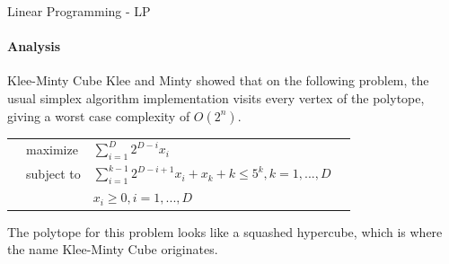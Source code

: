 \documentclass{beamer}
\begin{document}
%	
	\begin{frame}{Linear Programming - LP}
		\framesubtitle{Analysis}
		\begin{block}{Klee-Minty Cube}
			Klee and Minty showed that on the following problem, the usual simplex algorithm implementation visits every vertex of the polytope, giving a worst case complexity of $O(2^n)$.
			\begin{tabularx}{\textwidth}{X l l X}
				& maximize		& $\sum_{i=1}^{D}2^{D-i}x_i$		& \\
				& subject to	& $\sum_{i=1}^{k-1}2^{D-i+1}x_i + x_k+k\leq 5^k, k=1,...,D$	& \\
				& 				& $x_i \geq 0, i=1,...,D$
			\end{tabularx}
			The polytope for this problem looks like a squashed hypercube, which is where the name Klee-Minty Cube originates.
		\end{block}
	\end{frame}
	
\end{document}
